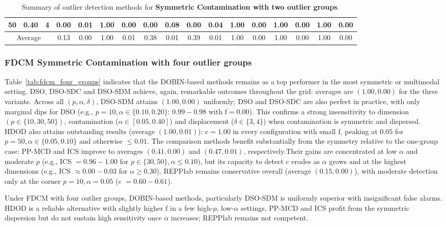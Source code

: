 \documentclass[12pt]{article}
\begin{document}
\begin{table}[H]
{\begin{tabular}{|*{17}{c|}|}
50 & 0.40 & 4 & 0.00 & 0.01 & 1.00 & 0.00 & 0.00 & 0.08 & 0.00 & 0.04 & 1.00 & 0.00 & 1.00 & 0.00 & 1.00 & 0.00 \\ \hline
\multicolumn{3}{|c|}{Average} & 0.13 & 0.00 & 1.00 & 0.01 & 0.38 & 0.01 & 0.39 & 0.01 & 1.00 & 0.00 & 1.00 & 0.00 & 1.00 & 0.00 \\ \hline
\end{tabular}}
\endgroup
\caption{Summary of outlier detection methods for \textbf{Symmetric Contamination with two outlier groups}.}
\label{tab:sym_two_group_new}
\end{table}


\subsubsection*{FDCM Symmetric Contamination with four outlier groups}


Table~\ref{tab:fdcm_four_groups} indicates that the DOBIN-based methods remains as a top performer in the most symmetric or multimodal setting. DSO, DSO-SDC and DSO-SDM achieve, again, remarkable outcomes throughout the grid: averages are \((1.00,0.00)\) for the three variants. 
Across all \((p,\alpha,\delta)\), DSO-SDM attains \((1.00,0.00)\) uniformly; DSO and DSO-SDC are also perfect in practice, with only marginal dips for DSO (e.g., \(p=10,\alpha\in\{0.10,0.20\}\): \(0.99{-}0.98\) with \(\text{f}=0.00\)). 
This confirms a strong insensitivity to dimension \((p\in\{10,30,50\})\), contamination (\(\alpha\in[0.05,0.40]\)) and displacement (\(\delta\in\{3,4\}\)) when contamination is symmetric and dispersed. HDOD also attains outstanding results (average \((1.00,0.01)\)): \(\text{c}=1.00\) in every configuration with small \(\text{f}\), peaking at \(0.05\) for \(p=50,\alpha\in\{0.05,0.10\}\) and otherwise \(\le 0.01\). The comparison methods benefit substantially from the symmetry relative to the one-group case: PP-MCD and ICS improve to averages \((0.41,0.00)\) and \((0.47,0.01)\), respectively.Their gains are concentrated at low \(\alpha\) and moderate \(p\) (e.g., ICS \(=0.96{-}1.00\) for \(p\in\{30,50\},\alpha\le 0.10\)), but its capacity to detect $c$ erodes as \(\alpha\) grows and at the highest dimensions (e.g., ICS \(\approx 0.00{-}0.03\) for \(\alpha\ge 0.30\)). REPPlab remains conservative overall (average \((0.15,0.00)\)), with moderate detection only at the corner \(p=10,\alpha=0.05\) (c \(=0.60{-}0.61\)).

Under FDCM with four outlier groups, DOBIN-based methods, particularly DSO-SDM is uniformly superior with insignificant false alarms. HDOD is a reliable alternative with slightly higher \(\text{f}\) in a few high-\(p\), low-\(\alpha\) settings. PP-MCD and ICS profit from the symmetric dispersion but do not sustain high sensitivity once \(\alpha\) increases; REPPlab remains not competent.
\end{document}
